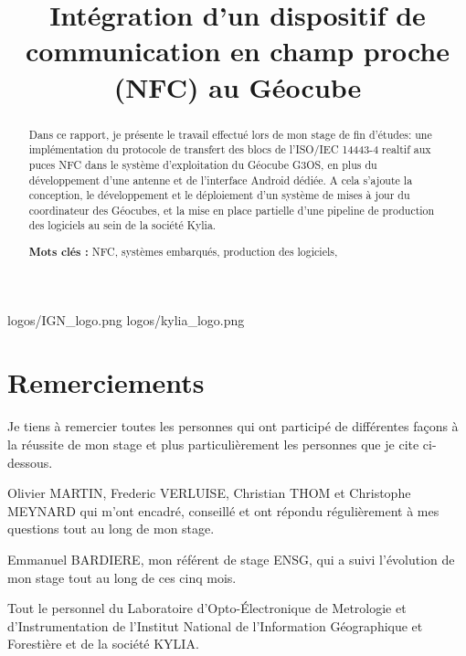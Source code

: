 \documentclass{themeensg}
\title{Intégration d’un dispositif de communication  en champ proche (NFC) au Géocube}
\begin{document}
\begin{titlepage}
\enterprise 
{logos/IGN_logo.png}
{}
{logos/kylia_logo.png}
{}


\end{titlepage}




\chapter*{Remerciements}

Je tiens à remercier toutes les personnes qui ont participé de différentes façons à la réussite de mon stage et plus particulièrement les personnes que je cite ci-dessous.

Olivier MARTIN, Frederic VERLUISE, Christian THOM et Christophe MEYNARD qui m'ont encadré, conseillé et ont répondu régulièrement à mes questions tout au long de mon stage.

Emmanuel BARDIERE, mon référent de stage ENSG, qui a suivi l'évolution de mon stage tout au long de ces cinq mois.

Tout le personnel du Laboratoire d'Opto-Électronique de Metrologie et d'Instrumentation de l'Institut National de l'Information Géographique et Forestière et de la société KYLIA.


\begin{abstract}
\thispagestyle{empty}
	\vspace{1cm}

	Dans ce rapport, je présente le travail effectué lors de mon stage de fin d'études: une implémentation du protocole de transfert des blocs de l'ISO/IEC 14443-4 realtif aux puces NFC dans le système d'exploitation du Géocube G3OS, en plus du développement d'une antenne et de l'interface Android dédiée. A cela s'ajoute la conception, le développement et le déploiement d'un système de mises à jour du coordinateur des Géocubes, et la mise en place partielle d'une pipeline de production des logiciels au sein de la société Kylia.
	
	\vspace{1.5cm}
	
	\textbf{Mots clés :} NFC, systèmes embarqués, production des logiciels,
\end{abstract}
\end{document}
